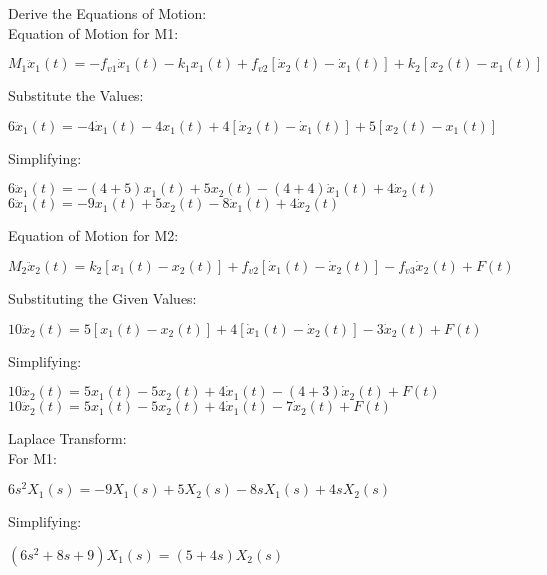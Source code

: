 \documentclass[11pt,letterpaper]{article}
\begin{document}
Derive the Equations of Motion:\\[12pt]
Equation of Motion for M1:\\
\begin{center}
	$M_1\ddot{x}_1(t)=-f_{v1}\dot{x}_1(t)-k_1x_1(t)+f_{v2}[\dot{x}_2(t)-\dot{x}_1(t)]+k_2[x_2(t)-x_1(t)]$\\
\end{center}
Substitute the Values:\\
\begin{center}
	$6\ddot{x}_1(t)=-4\dot{x}_1(t)-4x_1(t)+4[\dot{x}_2(t)-\dot{x}_1(t)]+5[x_2(t)-x_1(t)]$\\
\end{center}
Simplifying:\\
\begin{center}
	$6\ddot{x}_1(t)=-(4+5)x_1(t)+5x_2(t)-(4+4)\dot{x}_1(t)+4\dot{x}_2(t)$\\[12pt]
	$6\ddot{x}_1(t)=-9x_1(t)+5x_2(t)-8\dot{x}_1(t)+4\dot{x}_2(t)$\\[12pt]
\end{center}
Equation of Motion for M2:\\
\begin{center}
	$M_2\ddot{x}_2(t)=k_2[x_1(t)-x_2(t)]+f_{v2}[\dot{x}_1(t)-\dot{x}_2(t)]-f_{v3}\dot{x}_2(t)+F(t)$\\
\end{center}
Substituting the Given Values:\\
\begin{center}
	$10\ddot{x}_2(t)=5[x_1(t)-x_2(t)]+4[\dot{x}_1(t)-\dot{x}_2(t)]-3\dot{x}_2(t)+F(t)$\\
\end{center}
Simplifying:\\
\begin{center}
	$10\ddot{x}_2(t)=5x_1(t)-5x_2(t)+4\dot{x}_1(t)-(4+3)\dot{x}_2(t)+F(t)$\\[12pt]
	$10\ddot{x}_2(t)=5x_1(t)-5x_2(t)+4\dot{x}_1(t)-7\dot{x}_2(t)+F(t)$\\
\end{center}
Laplace Transform:\\[12pt]
For M1:\\
\begin{center}
	$6s^2X_1(s)=-9X_1(s)+5X_2(s)-8sX_1(s)+4sX_2(s)$\\[12pt]
\end{center}
Simplifying:\\
\begin{center}
	$(6s^2+8s+9)X_1(s)=(5+4s)X_2(s)$\\
\end{center}
\end{document}
